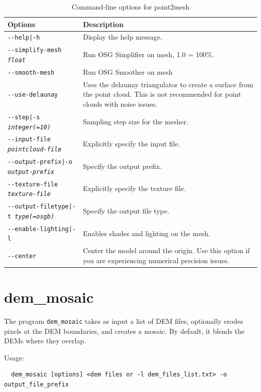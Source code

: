 \begin{longtable}{|l|p{10cm}|}
\caption{Command-line options for point2mesh}
\label{tbl:point2mesh}
\endfirsthead
\endhead
\endfoot
\endlastfoot
\hline
Options & Description \\ \hline \hline
\texttt{-\/-help|-h} & Display the help message.\\ \hline
\texttt{-\/-simplify-mesh \textit{float}} & Run OSG Simplifier on mesh, 1.0 = 100\%. \\ \hline
\texttt{-\/-smooth-mesh} & Run OSG Smoother on mesh \\ \hline
\texttt{-\/-use-delaunay} & Uses the delaunay triangulator to create a surface from the point cloud. This is not recommended for point clouds with noise issues. \\ \hline
\texttt{-\/-step|-s \textit{integer(=10)}} & Sampling step size for the mesher. \\ \hline
\texttt{-\/-input-file \textit{pointcloud-file}} & Explicitly specify the input file. \\ \hline
\texttt{-\/-output-prefix|-o \textit{output-prefix}} & Specify the output prefix. \\ \hline
\texttt{-\/-texture-file \textit{texture-file}} & Explicitly specify the texture file. \\ \hline
\texttt{-\/-output-filetype|-t \textit{type(=osgb)}} & Specify the output file type. \\ \hline
\texttt{-\/-enable-lighting|-l} & Enables shades and lighting on the mesh. \\ \hline
\texttt{-\/-center} & Center the model around the origin. Use this option if you are experiencing numerical precision issues. \\ \hline
\end{longtable}

\clearpage

\section{dem\_mosaic}
\label{demmosaic}

The program \texttt{dem\_mosaic} takes as input a list of \ac{DEM} files,
optionally erodes pixels at the \ac{DEM} boundaries, and creates a mosaic.
By default, it blends the DEMs where they overlap.

Usage:
\begin{verbatim}
  dem_mosaic [options] <dem files or -l dem_files_list.txt> -o output_file_prefix
\end{verbatim}

